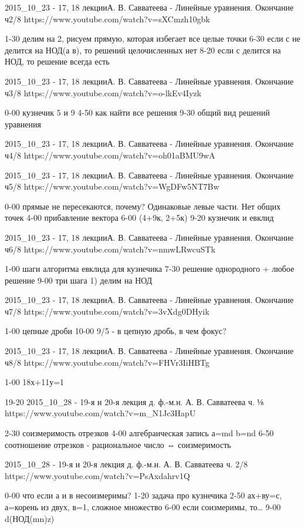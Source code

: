 2015_10_23 - 17, 18 лекцииА. В. Савватеева - Линейные уравнения. Окончание ч2/8
https://www.youtube.com/watch?v=sXCmzh10gbk

1-30 делим на 2, рисуем прямую, которая избегает все целые точки
6-30 если с не делится на НОД(а в), то решений целочисленных нет
8-20 если с делится на НОД, то решение всегда есть

2015_10_23 - 17, 18 лекцииА. В. Савватеева - Линейные уравнения. Окончание ч3/8
https://www.youtube.com/watch?v=o-lkEv4Iyzk

0-00 кузнечик 5 и 9 
4-50 как найти все решения
9-30 общий вид решений уравнения

2015_10_23 - 17, 18 лекцииА. В. Савватеева - Линейные уравнения. Окончание ч4/8
https://www.youtube.com/watch?v=oh01aBMU9wA

2015_10_23 - 17, 18 лекцииА. В. Савватеева - Линейные уравнения. Окончание ч5/8
https://www.youtube.com/watch?v=WgDFw5NT7Bw

0-00 прямые не пересекаются, почему? Одинаковые левые части. Нет общих точек
4-00 прибавление вектора
6-00 (4+9к, 2+5к)
9-20 кузнечик и евклид

2015_10_23 - 17, 18 лекцииА. В. Савватеева - Линейные уравнения. Окончание ч6/8
https://www.youtube.com/watch?v=nmwLRwcuSTk

1-00 шаги алгоритма евклида для кузнечика
7-30 решение однородного + любое решение
9-00 три шага 1) делим на НОД

2015_10_23 - 17, 18 лекцииА. В. Савватеева - Линейные уравнения. Окончание ч7/8
https://www.youtube.com/watch?v=3vXdg0DHyik

1-00 цепные дроби
10-00 9/5 - в цепную дробь, в чем фокус?

2015_10_23 - 17, 18 лекцииА. В. Савватеева - Линейные уравнения. Окончание ч8/8
https://www.youtube.com/watch?v=FHVr3IiHBTg

1-00 18х+11у=1

19-20
2015_10_28 - 19-я и 20-я лекция д. ф.-м.н. А. В. Савватеева ч. ⅛
https://www.youtube.com/watch?v=m_N1Jc3HapU

2-30 соизмеримость отрезков
4-00 алгебраическая запись а=md b=nd
6-50 соотношение отрезков - рациональное число ⇔ соизмеримость

2015_10_28 - 19-я и 20-я лекция д. ф.-м.н. А. В. Савватеева ч. 2/8
https://www.youtube.com/watch?v=PsAxdahrv1Q

0-00 что если а и в несоизмеримы?
1-20 задача про кузнечика
2-50 ах+ву=с, а=корень из двух, в=1, сложное множество
6-00 если соизмеримы, то…
9-00 d(НОД(mn)z)

